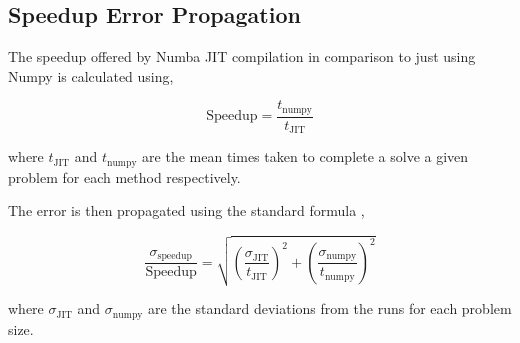 \label{app:errors}

\subsection{Speedup Error Propagation} \label{sec:app_numba}

The speedup offered by Numba JIT compilation in comparison to just using Numpy
is calculated using,

\begin{equation}
    \text{Speedup} = \frac{t_{\text{numpy}}}{t_{\text{JIT}}}
\end{equation}

where $t_{\text{JIT}}$ and $t_{\text{numpy}}$ are the mean times taken to complete
a solve a given problem for each method respectively.

The error is then propagated using the standard formula \cite{hughes2010measurements},

\begin{equation}
    \frac{\sigma_{\text{speedup}}}{\text{Speedup}} = \sqrt{
        \left ( \frac{\sigma_{\text{JIT}}}{t_{\text{JIT}}} \right )^2 +
        \left ( \frac{\sigma_{\text{numpy}}}{t_{\text{numpy}}} \right )^2
    }
\end{equation}

where $\sigma_{\text{JIT}}$ and $\sigma_{\text{numpy}}$ are the standard deviations
from the runs for each problem size.
